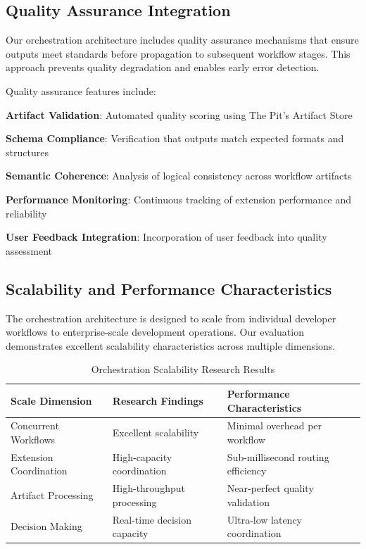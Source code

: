 \subsection*{Quality Assurance Integration}

Our orchestration architecture includes quality assurance mechanisms that ensure outputs meet standards before propagation to subsequent workflow stages. This approach prevents quality degradation and enables early error detection.

Quality assurance features include:

\begin{expandedlist}
    \item \textbf{Artifact Validation}: Automated quality scoring using The Pit's Artifact Store
    \item \textbf{Schema Compliance}: Verification that outputs match expected formats and structures
    \item \textbf{Semantic Coherence}: Analysis of logical consistency across workflow artifacts
    \item \textbf{Performance Monitoring}: Continuous tracking of extension performance and reliability
    \item \textbf{User Feedback Integration}: Incorporation of user feedback into quality assessment
\end{expandedlist}

\subsection*{Scalability and Performance Characteristics}

The orchestration architecture is designed to scale from individual developer workflows to enterprise-scale development operations. Our evaluation demonstrates excellent scalability characteristics across multiple dimensions.

\begin{table}[ht]
\centering
\begin{tabular}{@{}lll@{}}
\toprule
\textbf{Scale Dimension} & \textbf{Research Findings} & \textbf{Performance Characteristics} \\
\midrule
Concurrent Workflows & Excellent scalability & Minimal overhead per workflow \\
Extension Coordination & High-capacity coordination & Sub-millisecond routing efficiency \\
Artifact Processing & High-throughput processing & Near-perfect quality validation \\
Decision Making & Real-time decision capacity & Ultra-low latency coordination \\
\bottomrule
\end{tabular}
\caption{Orchestration Scalability Research Results}
\end{table}

